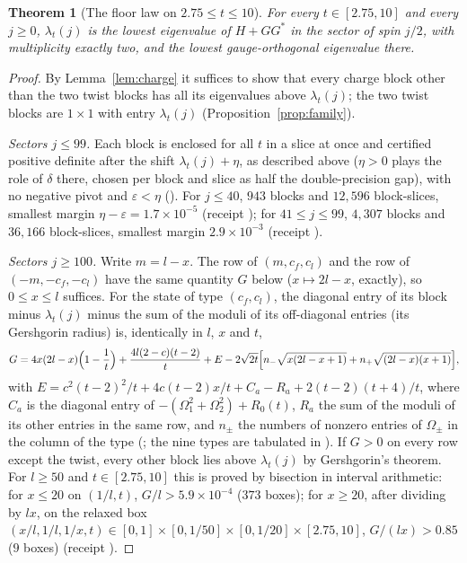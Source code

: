 \documentclass[11pt]{article}
\newtheorem{theorem}{Theorem}[section]
\theoremstyle{definition}
\theoremstyle{remark}
\begin{document}
\begin{theorem}[The floor law on $2.75\le t\le10$]\label{thm:range}
For every $t\in[2.75,10]$ and every $j\ge0$, $\lambda_t(j)$ is the
lowest eigenvalue of $H+GG^*$ in the sector of spin $j/2$, with multiplicity exactly two, and the lowest
gauge-orthogonal eigenvalue there.
\end{theorem}
\begin{proof}
By Lemma~\ref{lem:charge} it suffices to show that every charge block other than the two twist blocks has
all its eigenvalues above $\lambda_t(j)$; the two twist blocks are $1\times1$ with entry $\lambda_t(j)$
(Proposition~\ref{prop:family}).

\emph{Sectors $j\le99$.} Each block is enclosed for all $t$ in a slice at once and certified positive
definite after the shift $\lambda_t(j)+\eta$, as described above ($\eta>0$ plays the role of $\delta$ there, chosen per block and slice as half the double-precision gap), with no negative pivot and $\varepsilon<\eta$
(). For $j\le40$, $943$ blocks and $12{,}596$ block-slices, smallest
margin $\eta-\varepsilon=1.7\times10^{-5}$ (receipt ); for $41\le j\le99$, $4{,}307$
blocks and $36{,}166$ block-slices, smallest margin $2.9\times10^{-3}$ (receipt ).

\emph{Sectors $j\ge100$.} Write $m=l-x$. The row of $(m,c_f,c_l)$ and the row of $(-m,-c_f,-c_l)$ have the same
quantity $G$ below ($x\mapsto2l-x$, exactly), so $0\le x\le l$ suffices. For the state of type $(c_f,c_l)$, the diagonal entry of its block minus $\lambda_t(j)$ minus
the sum of the moduli of its off-diagonal entries (its Gershgorin radius) is, identically in $l$, $x$ and $t$,
\[
  G=4x(2l-x)\Bigl(1-\frac1t\Bigr)+\frac{4l(2-c)(t-2)}{t}+E-2\sqrt{2t}\Bigl[n_-\sqrt{x(2l-x+1)}+n_+\sqrt{(2l-x)(x+1)}\Bigr],
\]
with $E=c^2(t-2)^2/t+4c(t-2)x/t+C_a-R_a+2(t-2)(t+4)/t$, where $C_a$ is the diagonal entry of
$-(\Omega_1^2+\Omega_2^2)+R_0(t)$, $R_a$ the sum of the moduli of its other entries in the same row, and $n_\pm$ the
numbers of nonzero entries of $\Omega_\pm$ in the column of the type
(; the nine types are tabulated in
). If $G>0$ on every row except the twist, every other block lies above
$\lambda_t(j)$ by Gershgorin's theorem. For $l\ge50$ and $t\in[2.75,10]$ this is proved by bisection in interval
arithmetic: for $x\le20$ on $(1/l,t)$, $G/l>5.9\times10^{-4}$ ($373$ boxes); for $x\ge20$, after dividing by $lx$, on
the relaxed box $(x/l,1/l,1/x,t)\in[0,1]\times[0,1/50]\times[0,1/20]\times[2.75,10]$, $G/(lx)>0.85$ ($9$ boxes)
(receipt ).


\end{proof}
\end{document}

